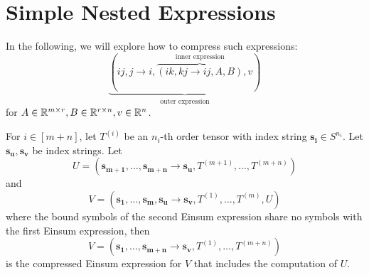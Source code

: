 \section{Simple Nested Expressions}

In the following, we will explore how to compress such expressions:
$$\underbrace{(ij, j \rightarrow i, \overbrace{(ik, kj \rightarrow ij, A, B)}^{\text{inner expression}}, v)}_{\text{outer expression}}$$
for $A \in \mathbb{R}^{m \times r}, B \in \mathbb{R}^{r \times n}, v \in \mathbb{R}^n$.

\begin{theorem}
    \label{thm:nested_einsum:simple}

    For $i \in [m + n]$, let $T^{(i)}$ be an $n_i$-th order tensor with index string $\bm{s_i} \in S^{n_i}$.
    Let $\bm{s_u}, \bm{s_v}$ be index strings.
    Let
    $$U = (\bm{s_{m + 1}},\dots,\bm{s_{m + n}} \rightarrow \bm{s_u}, T^{(m + 1)},\dots,T^{(m + n)})$$
    and
    $$V = (\bm{s_1},\dots,\bm{s_m}, \bm{s_u} \rightarrow \bm{s_v}, T^{(1)},\dots,T^{(m)}, U)$$
    where the bound symbols of the second Einsum expression share no symbols with the first Einsum expression,
    then
    $$V = (\bm{s_1}, \dots, \bm{s_{m + n}} \rightarrow \bm{s_v}, T^{(1)}, \dots, T^{(m + n)})$$
    is the compressed Einsum expression for $V$ that includes the computation of $U$.
\end{theorem}

